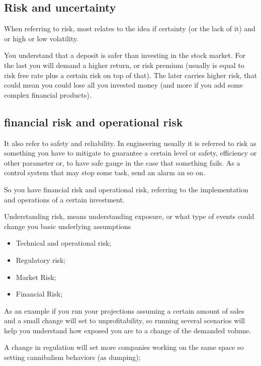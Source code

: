 \documentclass[]{book}
\providecommand{\tightlist}{%
  \setlength{\itemsep}{0pt}\setlength{\parskip}{0pt}}
\theoremstyle{definition}
\theoremstyle{definition}
\theoremstyle{definition}
\theoremstyle{remark}
\begin{document}
\subsection{Risk and uncertainty}\label{risk-and-uncertainty}

When referring to risk, most relates to the idea if certainty (or the
lack of it) and or high or low volatility.

You understand that a deposit is safer than investing in the stock
market. For the last you will demand a higher return, or risk premium
(usually is equal to risk free rate plus a certain risk on top of that).
The later carries higher risk, that could mean you could lose all you
invested money (and more if you add some complex financial products).

\subsection{financial risk and operational
risk}\label{financial-risk-and-operational-risk}

It also refer to safety and reliability. In engineering usually it is
referred to risk as something you have to mitigate to guarantee a
certain level or safety, efficiency or other parameter or, to have safe
gauge in the case that something fails. As a control system that may
stop some task, send an alarm an so on.

So you have financial risk and operational risk, referring to the
implementation and operations of a certain investment.

Understanding risk, means understanding exposure, or what type of events
could change you basic underlying assumptions

\begin{itemize}
\tightlist
\item
  Technical and operational risk;
\item
  Regulatory risk;
\item
  Market Risk;
\item
  Financial Risk;
\end{itemize}

As an example if you run your projections assuming a certain amount of
sales and a small change will set to unprofitability, so running several
scenarios will help you understand how exposed you are to a change of
the demanded volume.

A change in regulation will set more companies working on the same space
so setting cannibalism behaviors (as dumping);
\end{document}
